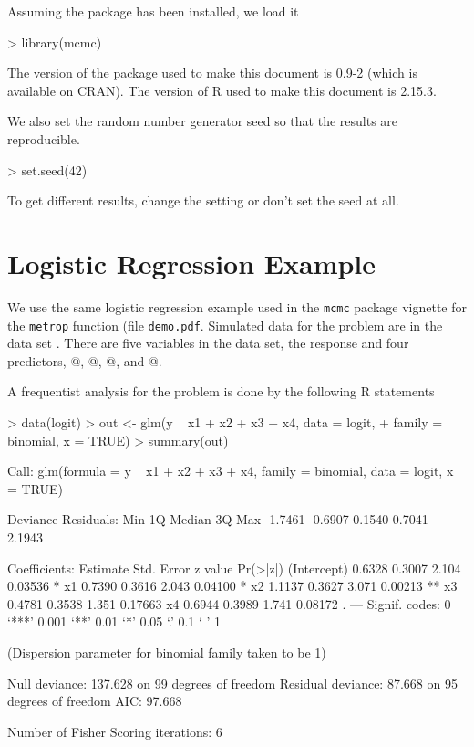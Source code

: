 \documentclass[11pt]{article}
\begin{document}
Assuming the \verb@mcmc@ package has been installed, we load it
\begin{Schunk}
\begin{Sinput}
> library(mcmc)
\end{Sinput}
\end{Schunk}
The version of the package used to make this document
is 0.9-2 (which is available on CRAN).
The version of R used to make this document is 2.15.3.

We also set the random number generator seed so that the results are
reproducible.
\begin{Schunk}
\begin{Sinput}
> set.seed(42)
\end{Sinput}
\end{Schunk}
To get different results, change the setting or don't set the seed at all.

\section{Logistic Regression Example}

We use the same logistic regression example used in the \texttt{mcmc}
package vignette for the \texttt{metrop} function (file \texttt{demo.pdf}.
Simulated data for the problem are in the data set \verb@logit@.
There are five variables in the data set, the response \verb@y@
and four predictors, @, @, @, and @.

A frequentist analysis for the problem is done by the following R statements
\begin{Schunk}
\begin{Sinput}
> data(logit)
> out <- glm(y ~ x1 + x2 + x3 + x4, data = logit,
+     family = binomial, x = TRUE)
> summary(out)
\end{Sinput}
\begin{Soutput}
Call:
glm(formula = y ~ x1 + x2 + x3 + x4, family = binomial, data = logit, 
    x = TRUE)

Deviance Residuals: 
    Min       1Q   Median       3Q      Max  
-1.7461  -0.6907   0.1540   0.7041   2.1943  

Coefficients:
            Estimate Std. Error z value Pr(>|z|)   
(Intercept)   0.6328     0.3007   2.104  0.03536 * 
x1            0.7390     0.3616   2.043  0.04100 * 
x2            1.1137     0.3627   3.071  0.00213 **
x3            0.4781     0.3538   1.351  0.17663   
x4            0.6944     0.3989   1.741  0.08172 . 
---
Signif. codes:  0 ‘***’ 0.001 ‘**’ 0.01 ‘*’ 0.05 ‘.’ 0.1 ‘ ’ 1 

(Dispersion parameter for binomial family taken to be 1)

    Null deviance: 137.628  on 99  degrees of freedom
Residual deviance:  87.668  on 95  degrees of freedom
AIC: 97.668

Number of Fisher Scoring iterations: 6
\end{Soutput}
\end{Schunk}
\end{document}
